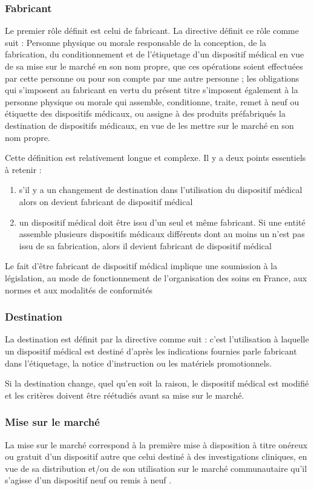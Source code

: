 \subsubsection{Fabricant}
Le premier rôle définit est celui de fabricant. La directive définit ce rôle comme suit : \og Personne physique ou morale responsable de la conception, de la fabrication, du conditionnement et de l'étiquetage d'un dispositif médical en vue de sa mise sur le marché en son nom propre, que ces opérations soient effectuées par cette personne ou pour son compte par une autre personne ; les obligations qui s'imposent au fabricant en vertu du présent titre s'imposent également à la personne physique ou morale qui assemble, conditionne, traite, remet à neuf ou étiquette des dispositifs médicaux, ou assigne à des produits préfabriqués la destination de dispositifs médicaux, en vue de les mettre sur le marché en son nom propre\fg .

Cette définition est relativement longue et complexe. Il y a deux points essentiels à retenir : 
\begin{enumerate}
\item s’il y a un changement de destination dans l’utilisation du dispositif médical alors on devient fabricant de dispositif médical
\item un dispositif médical doit être issu d’un seul et même fabricant. Si une entité assemble plusieurs dispositifs médicaux différents dont au moins un n’est pas issu de sa fabrication, alors il devient fabricant de dispositif médical
\end{enumerate}

Le fait d’être fabricant de dispositif médical implique une soumission à la législation, au mode de fonctionnement de l’organisation des soins en France, aux normes et aux modalités de conformités

\subsubsection{Destination}
La destination est définit par la directive comme suit : \og c'est l'utilisation à laquelle un dispositif médical est destiné d'après les indications fournies parle fabricant dans l'étiquetage, la notice d'instruction ou les matériels promotionnels\fg . 

Si la destination change, quel qu'en soit la raison, le dispositif médical est modifié et les critères doivent être réétudiés avant sa mise sur le marché.

\subsubsection{Mise sur le marché}
La mise sur le marché correspond à \og la première mise à disposition à titre onéreux ou gratuit d'un dispositif autre que celui destiné à des investigations cliniques, en vue de sa distribution  et/ou de son utilisation sur le marché communautaire qu'il s'agisse d'un dispositif neuf ou remis à neuf \fg .

